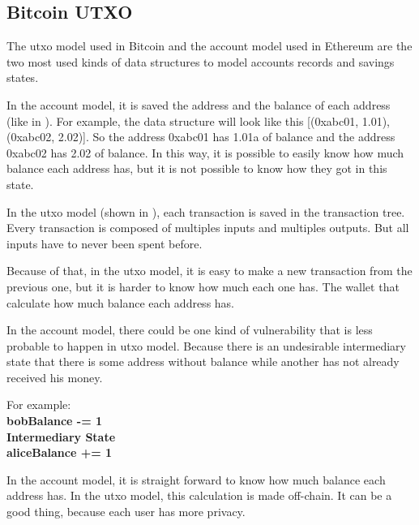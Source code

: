 \subsection{Bitcoin UTXO}


The \gls{utxo} model used in Bitcoin and the account model used in Ethereum are the two most used kinds
of data structures to model accounts records and savings states.

In the account model, it is saved the address and the balance of each address
(like in ).
For example, the data structure will look like this [(0xabc01, 1.01), (0xabc02, 2.02)].
So the address 0xabc01 has 1.01a of balance and the address 0xabc02 has 2.02 of balance.
In this way, it is possible to easily know how much balance each address has,
but it is not possible to know how they got in this state.


In the \gls{utxo} model (shown in ), each transaction is saved in the transaction tree.
Every transaction is composed of multiples inputs and multiples outputs.
But all inputs have to never been spent before.

Because of that, in the \gls{utxo} model, it is easy to make a new transaction from the previous one,
but it is harder to know how much each one has.
The wallet that calculate how much balance each address has.

In the account model, there could be one kind of vulnerability
that is less probable to happen in \gls{utxo} model.
Because there is an undesirable intermediary state that there is some address without balance while
another has not already received his money.

For example: \\
\textbf{
bobBalance -= 1 \\
Intermediary State \\
aliceBalance += 1
}

In the account model, it is straight forward to know how much balance each address has.
In the \gls{utxo} model, this calculation is made off-chain. It can be a good thing,
because each user has more privacy.
